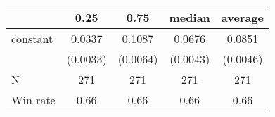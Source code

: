 \begin{tabular}{lcccc}
\hline
         &   0.25   &   0.75   &  median  & average   \\
\midrule
\midrule
constant & 0.0337   & 0.1087   & 0.0676   & 0.0851    \\
         & (0.0033) & (0.0064) & (0.0043) & (0.0046)  \\
N        & 271      & 271      & 271      & 271       \\
Win rate & 0.66     & 0.66     & 0.66     & 0.66      \\
\hline
\end{tabular}